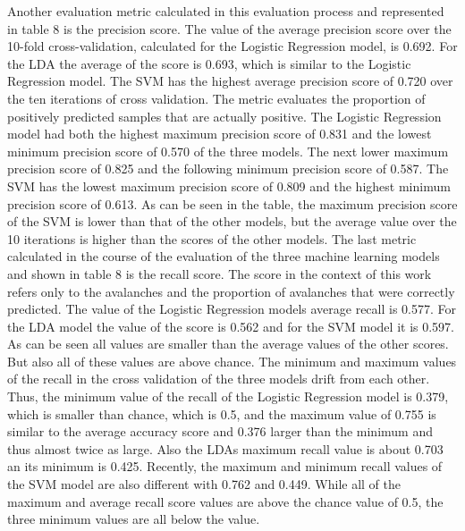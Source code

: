 \documentclass[../masterarbeit.tex]{subfiles}
\begin{document}
Another evaluation metric calculated in this evaluation process and represented in table 8 is the precision score. The value of the average precision score over the 10-fold cross-validation, calculated for the Logistic Regression model, is 0.692. For the LDA the average of the score is 0.693, which is similar to the Logistic Regression model. The SVM has the highest average precision score of 0.720 over the ten iterations of cross validation. The metric evaluates the proportion of positively predicted samples that are actually positive. The Logistic Regression model had both the highest maximum precision score of 0.831 and the lowest minimum precision score of 0.570 of the three models. The next lower maximum precision score of 0.825 and the following minimum precision score of 0.587. The SVM has the lowest maximum precision score of 0.809 and the highest minimum precision score of 0.613. As can be seen in the table, the maximum precision score of the SVM is lower than that of the other models, but the average value over the 10 iterations is higher than the scores of the other models. The last metric calculated in the course of the evaluation of the three machine learning models and shown in table 8 is the recall score. The score in the context of this work refers only to the avalanches and the proportion of avalanches that were correctly predicted. The value of the Logistic Regression models average recall is 0.577. For the LDA model the value of the score is 0.562 and for the SVM model it is 0.597. As can be seen all values are smaller than the average values of the other scores. But also all of these values are above chance. The minimum and maximum values of the recall in the cross validation of the three models drift from each other. Thus, the minimum value of the recall of the Logistic Regression model is 0.379, which is smaller than chance, which is 0.5, and the maximum value of 0.755 is similar to the average accuracy score and 0.376 larger than the minimum and thus almost twice as large. Also the LDAs maximum recall value is about 0.703 an its minimum is 0.425. Recently, the maximum and minimum recall values of the SVM model are also different with 0.762 and 0.449. While all of the maximum and average recall score values are above the chance value of 0.5, the three minimum values are all below the value. \\~\\
\end{document}
